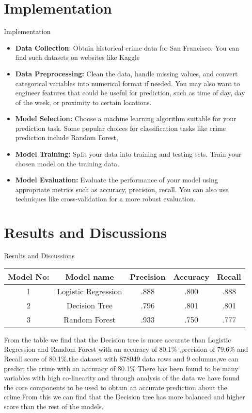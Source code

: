 \documentclass{beamer}
\begin{document}
\section{Implementation}
\begin{frame}{Implementation}
\begin{itemize}
 \item  \textbf{Data Collection}:
 Obtain historical crime data for San Francisco. You can find such datasets on websites like Kaggle 
\item \textbf{Data Preprocessing:} 
Clean the data, handle missing values, and convert categorical variables into numerical format if needed. You may also want to engineer features that could be useful for prediction, such as time of day, day of the week, or proximity to certain locations.
\item \textbf{Model Selection:} 
Choose a machine learning algorithm suitable for your prediction task. Some popular choices for classification tasks like crime prediction include Random Forest,
\item \textbf{Model Training:}
Split your data into training and testing sets. Train your chosen model on the training data.
\item \textbf{Model Evaluation:}
Evaluate the performance of your model using appropriate metrics such as accuracy, precision, recall. You can also use techniques like cross-validation for a more robust evaluation.

  \end{itemize}
\end{frame}
\section{Results and Discussions}
\begin{frame}{Results and Discussions}

\begin{table}[h!]
\centering
 \begin{tabular}{||c | c | c | c | c||} 
 \hline
 Model No: & Model name & Precision & Accuracy & Recall \\ 
 \hline
 1 & Logistic Regression & .888 & .800 & .888 \\ 
 2 & Decision Tree & .796 & .801 & .801 \\
 3 & Random Forest & .933 & .750 & .777\\
 \hline
 \end{tabular}
\end{table}
From the table we find that the Decision tree is  more accurate than Logistic Regression and Random Forest with an accuracy of 80.1\% ,precision of 79.6\% and Recall score of 80.1\%.the dataset with 878049 data rows and 9 columns,we can predict the crime with an accuracy of 80.1\%
There has been found to be many
variables with high co-linearity and through analysis of the data we have found the core components to be used
to obtain an accurate prediction about the crime.From this we can find that the Decision tree has more balanced and higher score than the rest of the models.

    
\end{frame}
\end{document}
